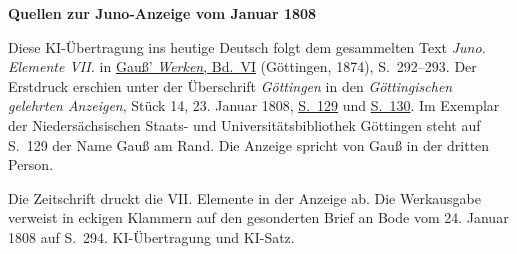 \clearpage\thispagestyle{empty}
\begin{center}\textbf{Quellen zur Juno-Anzeige vom Januar 1808}\end{center}
\noindent Diese KI-Übertragung ins heutige Deutsch folgt dem gesammelten Text \textit{Juno. Elemente VII.} in \href{https://gdz.sub.uni-goettingen.de/id/PPN236007467}{Gauß’ \textit{Werken}, Bd.~VI} (Göttingen, 1874), S.~292--293. Der Erstdruck erschien unter der Überschrift \textit{Göttingen} in den \textit{Göttingischen gelehrten Anzeigen}, Stück 14, 23. Januar 1808, \href{https://manifests.sub.uni-goettingen.de/iiif/image/gdz:PPN319721507_1808:00000131/full/1600,/0/default.jpg}{S.~129} und \href{https://manifests.sub.uni-goettingen.de/iiif/image/gdz:PPN319721507_1808:00000132/full/1600,/0/default.jpg}{S.~130}. Im Exemplar der Niedersächsischen Staats- und Universitätsbibliothek Göttingen steht auf S.~129 der Name Gauß am Rand. Die Anzeige spricht von Gauß in der dritten Person.
\par\medskip
Die Zeitschrift druckt die VII. Elemente in der Anzeige ab. Die Werkausgabe verweist in eckigen Klammern auf den gesonderten Brief an Bode vom 24. Januar 1808 auf S.~294. KI-Übertragung und KI-Satz.
\clearpage
